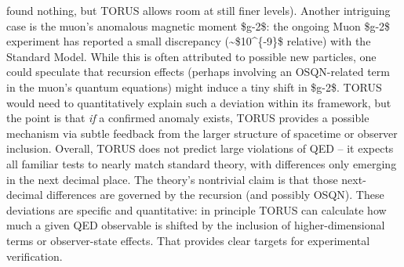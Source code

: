 \documentclass[
]{article}
\begin{document}
{found nothing, but TORUS allows room at still finer levels). Another
intriguing case is the muon's anomalous magnetic moment \$g-2\$: the
ongoing Muon \$g-2\$ experiment has reported a small discrepancy
(\textasciitilde\$10\^{}\{-9\}\$ relative) with the Standard Model.
While this is often attributed to possible new particles, one could
speculate that recursion effects (perhaps involving an OSQN-related term
in the muon's quantum equations) might induce a tiny shift in \$g-2\$.
TORUS would need to quantitatively explain such a deviation within its
framework, but the point is that \emph{if} a confirmed anomaly exists,
TORUS provides a possible mechanism via subtle feedback from the larger
structure of spacetime or observer inclusion. Overall, TORUS does not
predict large violations of QED -- it expects all familiar tests to
nearly match standard theory, with differences only emerging in the next
decimal place. The theory's nontrivial claim is that those next-decimal
differences are governed by the recursion (and possibly OSQN). These
deviations are specific and quantitative: in principle TORUS can
calculate how much a given QED observable is shifted by the inclusion of
higher-dimensional terms or observer-state effects. That provides clear
targets for experimental verification.}
\end{document}
